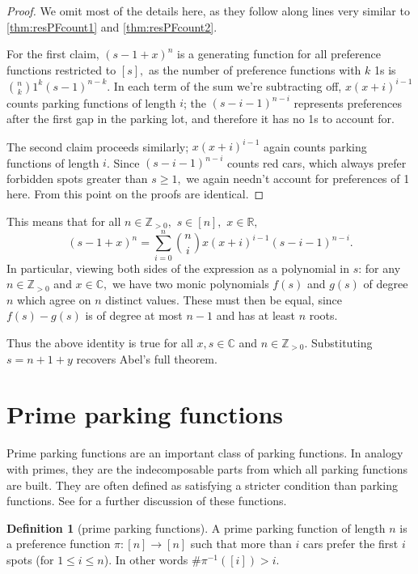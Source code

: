 \documentclass[12 pt]{amsart}
\theoremstyle{definition} %
\newtheorem{definition}[theorem]{Definition}
\theoremstyle{remark} %
\begin{document}
\begin{proof}
    We omit most of the details here, as they follow along lines very similar to \cref{thm:resPFcount1} and \cref{thm:resPFcount2}.
    
    For the first claim, $(s-1+x)^n$ is a generating function for all preference functions restricted to $[s],$ as the number of preference functions with $k$ 1s is $\binom{n}{k}1^k(s-1)^{n-k}.$ In each term of the sum we're subtracting off, $x(x+i)^{i-1}$  counts parking functions of length $i$; the $(s-i-1)^{n-i}$ represents preferences after the first gap in the parking lot, and therefore it has no 1s to account for.

    The second claim proceeds similarly; $x(x+i)^{i-1}$ again counts parking functions of length $i$. Since $(s-i-1)^{n-i}$ counts red cars, which always prefer forbidden spots greater than $s\ge1,$ we again needn't account for preferences of 1 here. From this point on the proofs are identical.
\end{proof}

This means that for all $n\in\mathbb{Z}_{>0},$ $s\in [n],$ $x\in\mathbb{R},$
\[(s-1+x)^{n} = \sum_{i = 0}^{n} \binom{n}{i} x(x + i)^{i - 1} (s - i - 1)^{n - i}.\]
In particular, viewing both sides of the expression as a polynomial in $s$: for any $n\in\mathbb{Z}_{>0}$ and $x\in\mathbb{C},$ we have two monic polynomials $f(s)$ and $g(s)$ of degree $n$ which agree on $n$ distinct values. These must then be equal, since $f(s)-g(s)$ is of degree at most $n-1$ and has at least $n$ roots.

Thus the above identity is true for all $x,s\in\mathbb{C}$ and $n\in\mathbb{Z}_{>0}.$ Substituting $s=n+1+y$ recovers Abel's full theorem.

\section{Prime parking functions}

Prime parking functions are an important class of parking functions. In analogy with primes, they are the indecomposable parts from which all parking functions are built. They are often defined as satisfying a stricter condition than parking functions. See \cite{armon-2024} for a further discussion of these functions.

\begin{definition}[prime parking functions]
	A prime parking function of length $n$ is a preference function $\pi : [n] \to [n]$ such that more than $i$ cars prefer the first $i$ spots (for $1 \le i \le n$). In other words $\# \pi^{-1}([i]) > i$.
\end{definition}
\end{document}
